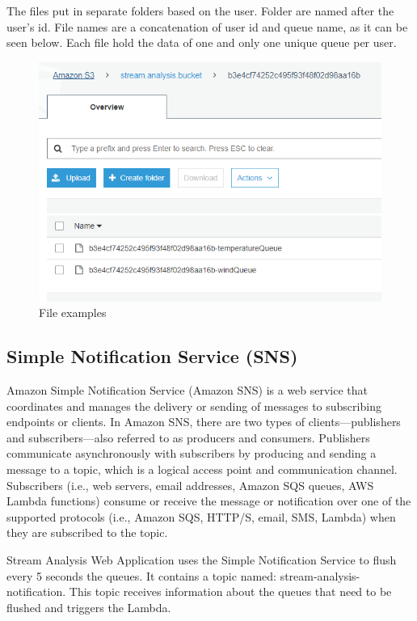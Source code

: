 The files put in separate folders based on the user. Folder are named after the user's id. File names are a concatenation of user id and queue name, as it can be seen below. Each file hold the data of one and only one unique queue per user.

\begin{figure}[h]
	\centering
	\includegraphics[width=1\linewidth]{./images/aws_resources/S3Files.PNG}
	\caption{File examples}
	\label{fig:s3Files}
\end{figure}

\subsection{Simple Notification Service (SNS)}
\label{chap:04:03:06}

Amazon Simple Notification Service (Amazon SNS) is a web service that coordinates and manages the delivery or sending of messages to subscribing endpoints or clients. In Amazon SNS, there are two types of clients—publishers and subscribers—also referred to as producers and consumers. Publishers communicate asynchronously with subscribers by producing and sending a message to a topic, which is a logical access point and communication channel. Subscribers (i.e., web servers, email addresses, Amazon SQS queues, AWS Lambda functions) consume or receive the message or notification over one of the supported protocols (i.e., Amazon SQS, HTTP/S, email, SMS, Lambda) when they are subscribed to the topic.\cite{sns}

Stream Analysis Web Application uses the Simple Notification Service to flush every 5 seconds the queues. It contains a topic named: stream-analysis-notification. This topic receives information about the queues that need to be flushed and triggers the Lambda.

